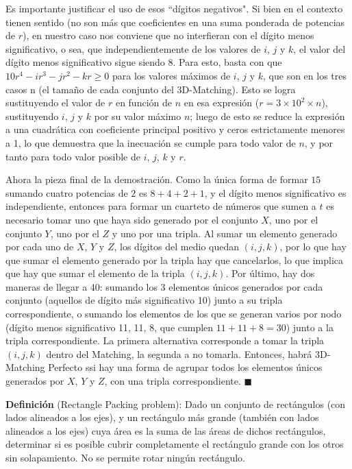 \documentclass{article}
\begin{document}
\bigskip

Es importante justificar el uso de esos ``dígitos negativos". Si bien en el contexto tienen sentido (no son más que coeficientes en una suma ponderada de potencias de $r$), en nuestro caso nos conviene que no interfieran con el dígito menos significativo, o sea, que independientemente de los valores de $i$, $j$ y $k$, el valor del dígito menos significativo sigue siendo 8. Para esto, basta con que $10r^4-ir^3-jr^2-kr \geq 0$ para los valores máximos de $i$, $j$ y $k$, que son en los tres casos n (el tamaño de cada conjunto del 3D-Matching). Esto se logra sustituyendo el valor de $r$ en función de $n$ en esa expresión ($r = 3 \times 10^2 \times n$), sustituyendo $i$, $j$ y $k$ por su valor máximo $n$; luego de esto se reduce la expresión a una cuadrática con coeficiente principal positivo y ceros estrictamente menores a 1, lo que demuestra que la inecuación se cumple para todo valor de $n$, y por tanto para todo valor posible de $i$, $j$, $k$ y $r$. 

\bigskip

Ahora la pieza final de la demostración. Como la única forma de formar $15$ sumando cuatro potencias de $2$ es $8+4+2+1$, y el dígito menos significativo es independiente, entonces para formar un cuarteto de números que sumen a $t$ es necesario tomar uno que haya sido generado por el conjunto $X$, uno por el conjunto $Y$, uno por el $Z$ y uno por una tripla. Al sumar un elemento generado por cada uno de $X$, $Y$ y $Z$, los dígitos del medio quedan $(i,j,k)$, por lo que hay que sumar el elemento generado por la tripla hay que cancelarlos, lo que implica que hay que sumar el elemento de la tripla $(i,j,k)$. Por último, hay dos maneras de llegar a 40: sumando los 3 elementos únicos generados por cada conjunto (aquellos de dígito más significativo 10) junto a su tripla correspondiente, o sumando los elementos de los que se generan varios por nodo (dígito menos significativo 11, 11, 8, que cumplen $11+11+8=30$) junto a la tripla correspondiente.  La primera alternativa corresponde a tomar la tripla $(i,j,k)$ dentro del Matching, la segunda a no tomarla. Entonces, habrá 3D-Matching Perfecto ssi hay una forma de agrupar todos los elementos únicos generados por $X$, $Y$ y $Z$, con una tripla correspondiente. $\blacksquare$

\bigskip

\textbf{Definición} (Rectangle Packing problem): Dado un conjunto de rectángulos (con lados alineados a los ejes), y un rectángulo más grande (también con lados alineados a los ejes) cuya área es la suma de las áreas de dichos rectángulos, determinar si es posible cubrir completamente el rectángulo grande con los otros sin solapamiento. No se permite rotar ningún rectángulo.
\end{document}

